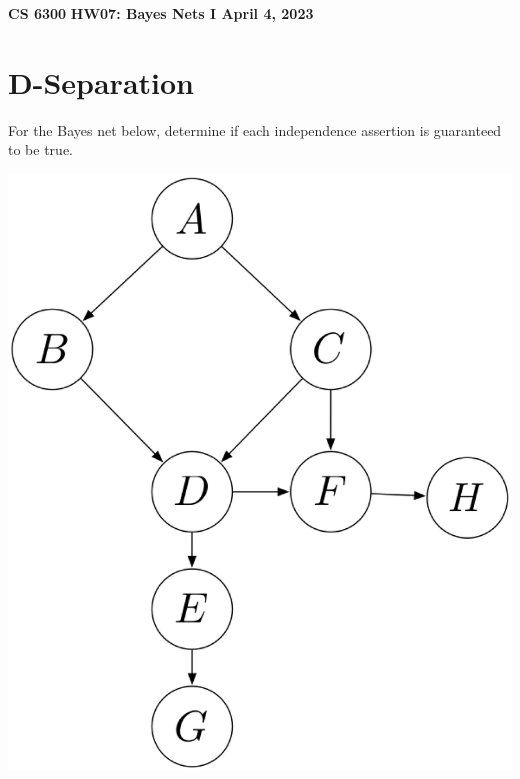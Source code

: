 \documentclass[12pt]{article}
\begin{document}
\begin{center}
{\bf CS 6300} \hfill {\large\bf HW07: Bayes Nets I \hfill April 4, 2023}
\end{center}

\section{D-Separation}

For the Bayes net below, determine if each independence assertion is guaranteed to be true.

\begin{center}
\includegraphics[width=0.35\linewidth]{bayes.eps}
\end{center}
    
\end{document}
